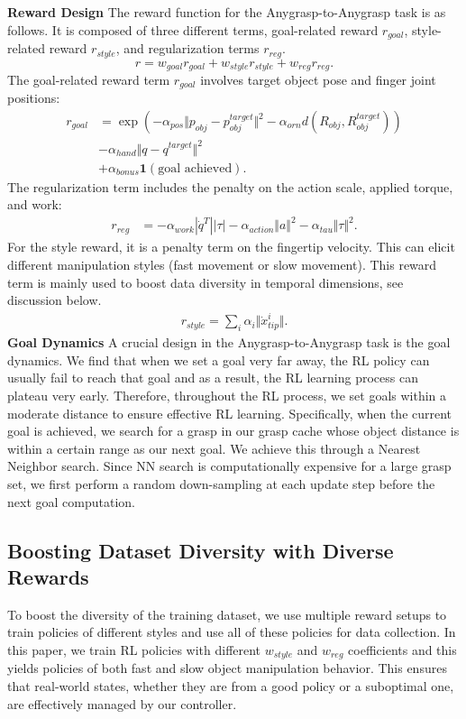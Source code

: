 \textbf{Reward Design} The reward function for the Anygrasp-to-Anygrasp task is as follows. It is composed of three different terms, goal-related reward $r_{goal}$, style-related reward $r_{style}$, and regularization terms $r_{reg}$.
\begin{equation}
    r = w_{goal} r_{goal} + w_{style}r_{style} + w_{reg}r_{reg}.
\end{equation}
The goal-related reward term $r_{goal}$ involves target object pose and finger joint positions:
\begin{align}
    r_{goal} &= \exp (-\alpha_{pos} \Vert p_{obj}-p_{obj}^{target}\Vert^2 -\alpha_{orn} d(R_{obj}, R_{obj}^{target})) \\ & - \alpha_{hand} \Vert q - q^{target}\Vert^2 \\
    &+ \alpha_{bonus}\mathbf{1}(\text{goal achieved}). 
\end{align}
The regularization term includes the penalty on the action scale, applied torque, and work:
\begin{align}
    r_{reg} &= - \alpha_{work} |\dot{q}^T||\tau| - \alpha_{action} \Vert a\Vert^2 - \alpha_{tau}\Vert\tau\Vert^2. 
\end{align}
For the style reward, it is a penalty term on the fingertip velocity. This can elicit different manipulation styles (fast movement or slow movement). This reward term is mainly used to boost data diversity in temporal dimensions, see discussion below. 
\begin{align}
    r_{style}=\sum_i\alpha_i \Vert \dot{x}_{tip}^{i}\Vert.
\end{align}
\textbf{Goal Dynamics}
A crucial design in the Anygrasp-to-Anygrasp task is the goal dynamics. We find that when we set a goal very far away, the RL policy can usually fail to reach that goal and as a result, the RL learning process can plateau very early. Therefore, throughout the RL process, we set goals within a moderate distance to ensure effective RL learning. Specifically, when the current goal is achieved, we search for a grasp in our grasp cache whose object distance is within a certain range as our next goal. We achieve this through a Nearest Neighbor search. Since NN search is computationally expensive for a large grasp set, we first perform a random down-sampling at each update step before the next goal computation.

\subsection{Boosting Dataset Diversity with Diverse Rewards}
To boost the diversity of the training dataset, we use multiple reward setups to train policies of different styles and use all of these policies for data collection. In this paper, we train RL policies with different $w_{style}$ and $w_{reg}$ coefficients and this yields policies of both fast and slow object manipulation behavior. This ensures that real-world states, whether they are from a good policy or a suboptimal one, are effectively managed by our controller.

